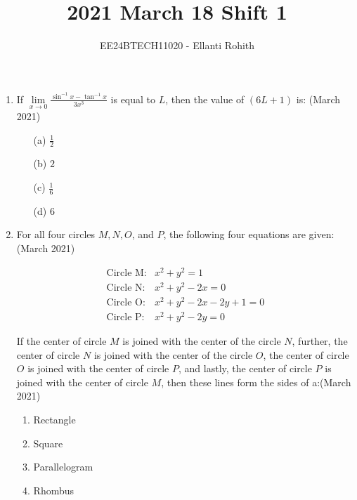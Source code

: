 \documentclass[journal,12pt,onecolumn]{IEEEtran}
\theoremstyle{remark}
\begin{document}

\vspace{3cm}

\title{2021 March 18 Shift 1}
\author{EE24BTECH11020 -  Ellanti Rohith}
\maketitle

\renewcommand{\thefigure}{\theenumi}
\renewcommand{\thetable}{\theenumi}






\begin{enumerate}



\item If $\lim\limits_{x \to 0} \frac{\sin^{-1} x - \tan^{-1} x}{3x^3}$ is equal to $L$, then the value of $(6L + 1)$ is: \hfill (March 2021)
\begin{multicols}{4}
\begin{enumerate}
     \item[(a)] $\frac{1}{2}$
    \item[(b)] $2$
    \item[(c)] $\frac{1}{6}$
    \item[(d)] $6$
\end{enumerate}
\end{multicols}

   
\item For all four circles $M, N, O$, and $P$, the following four equations are given:\hfill (March 2021)

\begin{align*}
\text{Circle M}:  &  x^2 + y^2 = 1 \\
\text{Circle N}:  &  x^2 + y^2 - 2x = 0 \\
\text{Circle O}:  &  x^2 + y^2 - 2x - 2y + 1 = 0 \\
\text{Circle P}:  &  x^2 + y^2 - 2y = 0
\end{align*}

If the center of circle $M$ is joined with the center of the circle $N$, further, the center of circle $N$ is joined with the center of the circle $O$, the center of circle $O$ is joined with the center of circle $P$, and lastly, the center of circle $P$ is joined with the center of circle $M$, then these lines form the sides of a:\hfill (March 2021)
\begin{multicols}{2}
\begin{enumerate}
    \item Rectangle
    \item Square
    \item Parallelogram
    \item Rhombus
\end{enumerate}
    

\end{multicols}
\end{enumerate}
\end{document}
